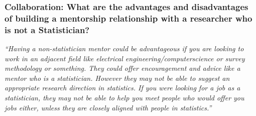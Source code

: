 \documentclass[12pt]{beamer}
\newcommand\ans[1]{{\it ``#1''}}
\newcommand\gap{\vspace{5mm}}
\begin{document}
\begin{frame} %
  \frametitle{Collaboration: What are the advantages and disadvantages of building a mentorship relationship with a researcher who is not a Statistician?}
  


\ans{Having  a  non-statistician  mentor  could  be  advantageous  if  you  are looking to work in an adjacent field like electrical engineering/computerscience or survey methodology or something. They could offer encouragement and advice like a mentor who is a statistician.  However they may not be  able  to  suggest  an  appropriate  research  direction  in  statistics.   If you were looking for a job as a statistician, they may not be able to help you meet people who would offer you jobs either, unless they are closely aligned with people in statistics.}









\end{frame}
\end{document}
